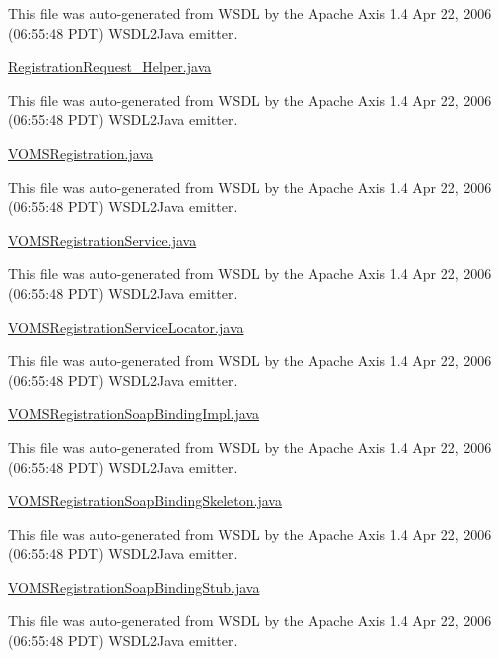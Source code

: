 This file was auto-\/generated from WSDL by the Apache Axis 1.4 Apr 22, 2006 (06:55:48 PDT) WSDL2Java emitter.

\hyperlink{RegistrationRequest__Helper_8java}{RegistrationRequest\_\-Helper.java}

This file was auto-\/generated from WSDL by the Apache Axis 1.4 Apr 22, 2006 (06:55:48 PDT) WSDL2Java emitter.

\hyperlink{VOMSRegistration_8java}{VOMSRegistration.java}

This file was auto-\/generated from WSDL by the Apache Axis 1.4 Apr 22, 2006 (06:55:48 PDT) WSDL2Java emitter.

\hyperlink{VOMSRegistrationService_8java}{VOMSRegistrationService.java}

This file was auto-\/generated from WSDL by the Apache Axis 1.4 Apr 22, 2006 (06:55:48 PDT) WSDL2Java emitter.

\hyperlink{VOMSRegistrationServiceLocator_8java}{VOMSRegistrationServiceLocator.java}

This file was auto-\/generated from WSDL by the Apache Axis 1.4 Apr 22, 2006 (06:55:48 PDT) WSDL2Java emitter.

\hyperlink{VOMSRegistrationSoapBindingImpl_8java}{VOMSRegistrationSoapBindingImpl.java}

This file was auto-\/generated from WSDL by the Apache Axis 1.4 Apr 22, 2006 (06:55:48 PDT) WSDL2Java emitter.

\hyperlink{VOMSRegistrationSoapBindingSkeleton_8java}{VOMSRegistrationSoapBindingSkeleton.java}

This file was auto-\/generated from WSDL by the Apache Axis 1.4 Apr 22, 2006 (06:55:48 PDT) WSDL2Java emitter.

\hyperlink{VOMSRegistrationSoapBindingStub_8java}{VOMSRegistrationSoapBindingStub.java}

This file was auto-\/generated from WSDL by the Apache Axis 1.4 Apr 22, 2006 (06:55:48 PDT) WSDL2Java emitter. 